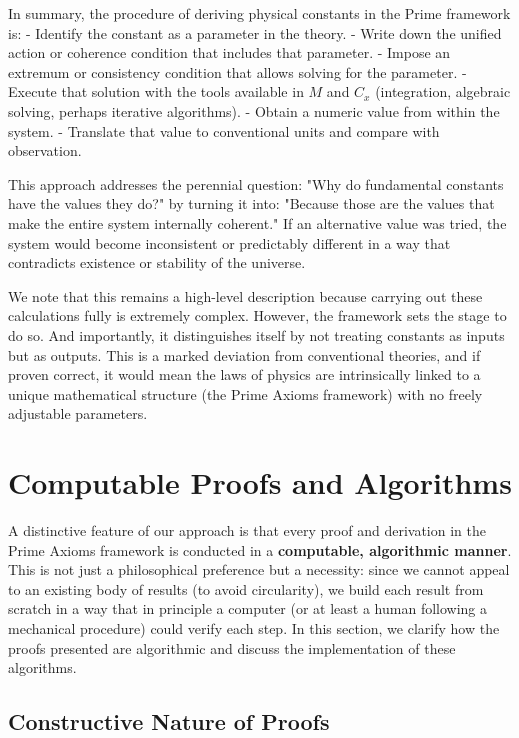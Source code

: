 \documentclass[11pt]{article}
\begin{document}
In summary, the procedure of deriving physical constants in the Prime framework is:
- Identify the constant as a parameter in the theory.
- Write down the unified action or coherence condition that includes that parameter.
- Impose an extremum or consistency condition that allows solving for the parameter.
- Execute that solution with the tools available in $M$ and $C_x$ (integration, algebraic solving, perhaps iterative algorithms).
- Obtain a numeric value from within the system.
- Translate that value to conventional units and compare with observation.

This approach addresses the perennial question: "Why do fundamental constants have the values they do?" by turning it into: "Because those are the values that make the entire system internally coherent." If an alternative value was tried, the system would become inconsistent or predictably different in a way that contradicts existence or stability of the universe.

We note that this remains a high-level description because carrying out these calculations fully is extremely complex. However, the framework sets the stage to do so. And importantly, it distinguishes itself by not treating constants as inputs but as outputs. This is a marked deviation from conventional theories, and if proven correct, it would mean the laws of physics are intrinsically linked to a unique mathematical structure (the Prime Axioms framework) with no freely adjustable parameters.

\section{Computable Proofs and Algorithms}

A distinctive feature of our approach is that every proof and derivation in the Prime Axioms framework is conducted in a \textbf{computable, algorithmic manner}. This is not just a philosophical preference but a necessity: since we cannot appeal to an existing body of results (to avoid circularity), we build each result from scratch in a way that in principle a computer (or at least a human following a mechanical procedure) could verify each step. In this section, we clarify how the proofs presented are algorithmic and discuss the implementation of these algorithms.

\subsection*{Constructive Nature of Proofs}
\end{document}
